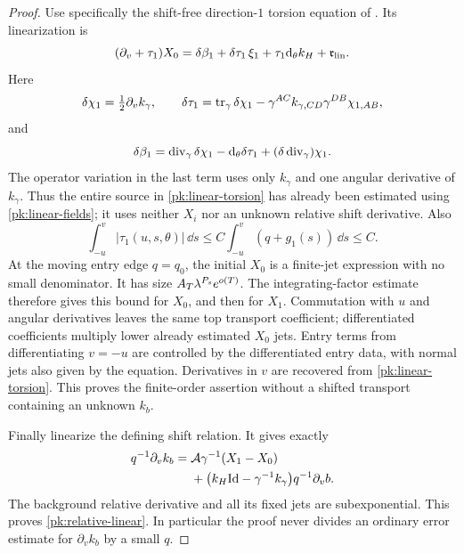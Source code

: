 \begin{proof}
Use specifically the shift-free direction-$1$ torsion equation
of \cite[]{KerrCTwo}. Its linearization is
\begin{equation}\label{pk:linear-torsion}
 (\partial_v+\tau_1)X_0
   =\delta\beta_1+\delta\tau_1\,\xi_1
                     +\tau_1\mathrm d_\theta k_H+\mathfrak r_{
                     \rm lin}.
\end{equation}
Here
\[
 \delta\chi_1=\tfrac12\partial_vk_\gamma,\qquad
 \delta\tau_1=\operatorname{tr}_\gamma\delta\chi_1
                 -\gamma^{AC}k_{\gamma,CD}\gamma^{DB}\chi_{1,AB},
\]
and
\[
 \delta\beta_1=\operatorname{div}_\gamma\delta\chi_1
 -\mathrm d_\theta\delta\tau_1+(\delta\operatorname{div}_\gamma)\chi_1.
\]
The operator variation in the last term uses only $k_\gamma$
and one angular derivative of $k_\gamma$. Thus the entire source
in \eqref{pk:linear-torsion} has already been estimated using
\eqref{pk:linear-fields}; it uses neither $X_i$ nor an unknown
relative shift derivative. Also
\[
 \int_{-u}^{v}|\tau_1(u,s,\theta)|\,\dd s
       \le C\int_{-u}^{v}(q+g_1(s))\,\dd s\le C.
\]
At the moving entry edge $q=q_0$, the initial $X_0$ is a finite-jet
expression with no small denominator. It has size
$A_T\lambda^{P_s}e^{o(T)}$. The integrating-factor estimate
therefore gives this bound for $X_0$, and then for $X_1$.
Commutation with $u$ and angular derivatives leaves the same top
transport coefficient; differentiated coefficients multiply lower
already estimated $X_0$ jets. Entry terms from differentiating
$v=-u$ are controlled by the differentiated entry data, with normal
jets also given by the equation. Derivatives in $v$ are recovered
from \eqref{pk:linear-torsion}. This proves the finite-order
assertion without a shifted transport containing an unknown $k_b$.

Finally linearize the defining shift relation. It gives exactly
\begin{equation}\label{pk:relative-shift}
 \begin{split}
 q^{-1}\partial_vk_b={}&\mathcal A\gamma^{-1}(X_1-X_0)\\
 &+\bigl(k_H\mathrm{Id}-\gamma^{-1}k_\gamma\bigr)
                                      q^{-1}\partial_vb.
 \end{split}
\end{equation}
The background relative derivative and all its fixed jets are
subexponential. This proves \eqref{pk:relative-linear}. In
particular the proof never divides an ordinary error estimate
for $\partial_vk_b$ by a small $q$.
\end{proof}

